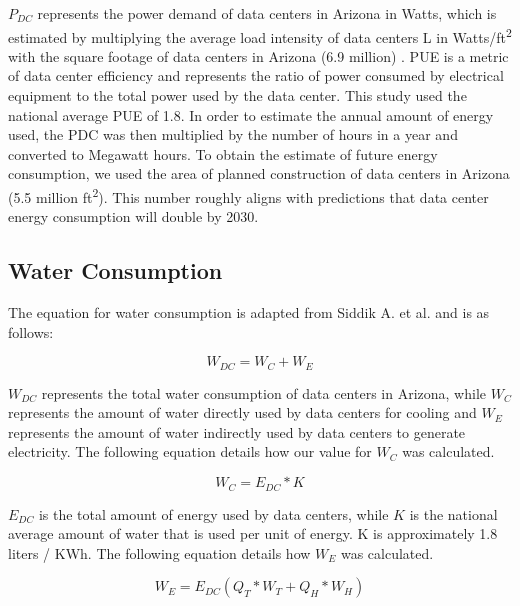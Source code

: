 \documentclass[letterpaper, 12 pt]{article}  %
\begin{document}
\(P_{DC}\) represents the power demand of data centers in Arizona in Watts, which is estimated by multiplying the average load intensity of data centers L in Watts/ft\textsuperscript{2}\cite{DCPower} with the square footage of data centers in Arizona (6.9 million) \cite{DCArea}. PUE is a metric of data center efficiency and represents the ratio of power consumed by electrical equipment to the total power used by the data center. This study used the national average PUE of 1.8\cite{DCPUE}.
 In order to estimate the annual amount of energy used, the PDC was then multiplied by the number of hours in a year and converted to Megawatt hours. To obtain the estimate of future energy consumption, we used the area of planned construction of data centers in Arizona (5.5 million ft\textsuperscript{2}\cite{DCArea}). This number roughly aligns with predictions that data center energy consumption will double by 2030\cite{GSDemand}.





\subsection{Water Consumption}
The equation for water consumption is adapted from Siddik A. et al.\cite{EnvImpactDC} and is as follows:

\begin{equation}
    W_{DC} = W_C + W_E
\end{equation}

\(W_{DC}\) represents the total water consumption of data centers in Arizona, while \(W_C\) represents the amount of water directly used by data centers for cooling and \(W_E\) represents the amount of water indirectly used by data centers to generate electricity. The following equation details how our value for \(W_C\) was calculated.

\begin{equation}
    W_C = E_{DC} * K
\end{equation}

\(E_{DC}\) is the total amount of energy used by data centers, while \(K\) is the national average amount of water that is used per unit of energy. K is approximately 1.8 liters / KWh\cite{CoolingEnergy}. The following equation details how \(W_E\) was calculated.

\begin{equation}
    W_E = E_{DC} (Q_T * W_T + Q_H * W_H)
\end{equation}
\end{document}
